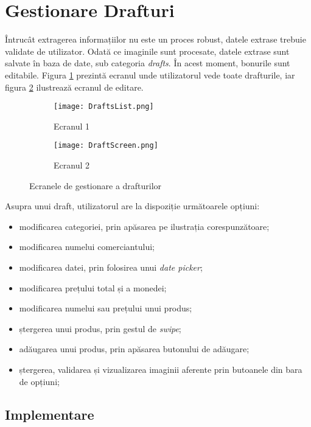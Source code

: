 \section{Gestionare Drafturi}

Întrucât extragerea informațiilor nu este un proces robust, datele extrase trebuie validate de utilizator. Odată ce imaginile sunt procesate, datele extrase sunt salvate în baza de date, sub categoria \emph{drafts}. În acest moment, bonurile sunt editabile. Figura \ref{fig:draftList} prezintă ecranul unde utilizatorul vede toate drafturile, iar figura \ref{fig:draftScreen} ilustrează ecranul de editare.

\begin{figure}[!h]
  \centering
  \begin{subfigure}{0.49\textwidth}
    \centering
    \texttt{[image: DraftsList.png]}
    \caption{Ecranul 1}
    \label{fig:draftList}
  \end{subfigure}
  \begin{subfigure}{0.49\textwidth}
    \centering
    \texttt{[image: DraftScreen.png]}
    \caption{Ecranul 2}
    \label{fig:draftScreen}
  \end{subfigure}
  \caption{Ecranele de gestionare a drafturilor}
  \label{fig:drafts}
\end{figure}

Asupra unui draft, utilizatorul are la dispoziție următoarele opțiuni:

\begin{itemize}
  \item
    modificarea categoriei, prin apăsarea pe ilustrația corespunzătoare;
  \item
    modificarea numelui comerciantului;
  \item
    modificarea datei, prin folosirea unui \emph{date picker};
  \item
    modificarea prețului total și a monedei;
  \item
    modificarea numelui sau prețului unui produs;
  \item
    ștergerea unui produs, prin gestul de \emph{swipe};
  \item
    adăugarea unui produs, prin apăsarea butonului de adăugare;
  \item
    ștergerea, validarea și vizualizarea imaginii aferente prin butoanele din bara de opțiuni;
\end{itemize}

\subsection{Implementare}

